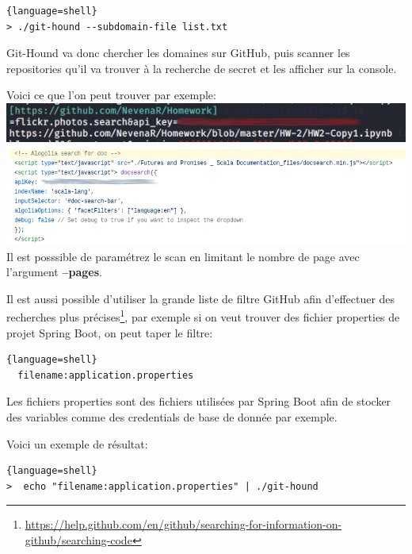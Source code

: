 \begin{lstlisting}{language=shell}
> ./git-hound --subdomain-file list.txt
\end{lstlisting}
  
Git-Hound va donc chercher les domaines sur GitHub, puis scanner les repositories qu'il va trouver à la recherche de secret et les afficher sur la console.

Voici ce que l'on peut trouver par exemple: \\

\includegraphics[scale=0.48]{images/SEN_Projet_Image014.png} \\

\includegraphics[scale=0.48]{images/SEN_Projet_Image013.png} \\

Il est posssible de paramétrez le scan en limitant le nombre de page avec l'argument {\bfseries --pages}.

Il est aussi possible d'utiliser la grande liste de filtre GitHub afin d'effectuer des recherches plus précises\footnote{\url{https://help.github.com/en/github/searching-for-information-on-github/searching-code}},
par exemple si on veut trouver des fichier properties de projet Spring Boot, on peut taper le filtre:
\\

\begin{lstlisting}{language=shell}
  filename:application.properties
\end{lstlisting}

Les fichiers properties sont des fichiers utilisées par Spring Boot afin de stocker des variables comme des credentials de base de donnée par exemple.

Voici un exemple de résultat: \\

\begin{lstlisting}{language=shell}
>  echo "filename:application.properties" | ./git-hound
\end{lstlisting}

